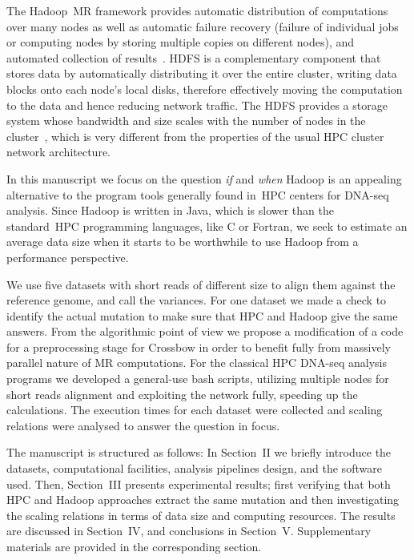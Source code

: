 \documentclass[11pt, oneside]{article}   	%
\begin{document}
The Hadoop~MR framework provides automatic distribution of computations over many nodes as well as automatic failure recovery (failure of individual jobs or computing nodes by storing multiple copies on different nodes), and automated collection of results~\cite{Hadoop:Guide}. HDFS is a complementary component that stores data by automatically distributing it over the entire cluster, writing data blocks onto each node’s local disks, therefore effectively moving the computation to the data and hence reducing network traffic. The HDFS provides a storage system whose bandwidth and size scales with the number of nodes in the cluster~\cite{Sammer:2012}, which is very different from the properties of the usual HPC cluster network architecture. 

In this manuscript we focus on the question {\it if} and {\it when} Hadoop is an appealing alternative to the program tools generally found in~HPC centers for DNA-seq analysis. Since Hadoop is written in Java, which is slower than the standard~HPC programming languages, like C or Fortran, we seek to estimate an average data size when it starts to be worthwhile to use Hadoop from a performance perspective. 

We use five datasets with short reads of different size to align them against the reference genome, and call the  variances.  For one dataset we made a check to identify the actual mutation to make sure that HPC and Hadoop give the same answers. 
From the algorithmic point of view we propose a modification of a code for a preprocessing stage for Crossbow in order to benefit fully from massively parallel nature of MR computations. 
For the classical HPC DNA-seq analysis programs we developed a general-use bash scripts, utilizing multiple nodes for short reads alignment and exploiting the network fully, speeding up the calculations.
The execution times for each dataset were collected and scaling relations were analysed to answer the question in focus.

The manuscript is structured as follows: In Section~II we briefly introduce the datasets, computational facilities, analysis pipelines design,  and the software used. Then, Section~III presents experimental results; first verifying that both HPC and Hadoop approaches extract the same mutation and then investigating the scaling relations in terms of data size and computing resources. The results are discussed in Section~IV, and conclusions in Section~V. Supplementary materials are provided in the corresponding section.
\end{document}

